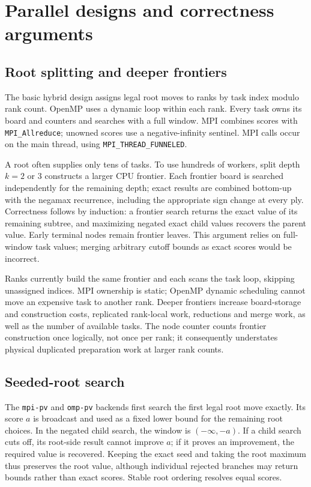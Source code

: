 \documentclass[11pt,a4paper]{article}
\newcommand{\code}[1]{\texttt{#1}}
\begin{document}
\section{Parallel designs and correctness arguments}
\subsection{Root splitting and deeper frontiers}
The basic hybrid design assigns legal root moves to ranks by task index modulo
rank count. OpenMP uses a dynamic loop within each rank. Every task owns its
board and counters and searches with a full window. MPI combines scores with
\code{MPI\_Allreduce}; unowned scores use a negative-infinity sentinel.
MPI calls occur on the main thread, using \code{MPI\_THREAD\_FUNNELED}.

A root often supplies only tens of tasks. To use hundreds of workers, split
depth $k=2$ or $3$ constructs a larger CPU frontier. Each frontier board is
searched independently for the remaining depth; exact results are combined
bottom-up with the negamax recurrence, including the appropriate sign change
at every ply. Correctness follows by induction: a frontier search returns the
exact value of its remaining subtree, and maximizing negated exact child values
recovers the parent value. Early terminal nodes remain frontier leaves. This
argument relies on full-window task values; merging arbitrary cutoff bounds as
exact scores would be incorrect.

Ranks currently build the same frontier and each scans the task loop, skipping
unassigned indices. MPI ownership is static; OpenMP dynamic scheduling cannot
move an expensive task to another rank. Deeper frontiers increase board-storage
and construction costs, replicated rank-local work, reductions and merge work,
as well as the number of available tasks. The node counter counts frontier
construction once logically, not once per rank; it consequently understates
physical duplicated preparation work at larger rank counts.

\subsection{Seeded-root search}
The \code{mpi-pv} and \code{omp-pv} backends first search the first legal root
move exactly. Its score $a$ is broadcast and used as a fixed lower bound for the
remaining root choices. In the negated child search, the window is
$(-\infty,-a)$. If a child search cuts off, its root-side result cannot improve
$a$; if it proves an improvement, the required value is recovered. Keeping the
exact seed and taking the root maximum thus preserves the root value, although
individual rejected branches may return bounds rather than exact scores.
Stable root ordering resolves equal scores.
\end{document}
